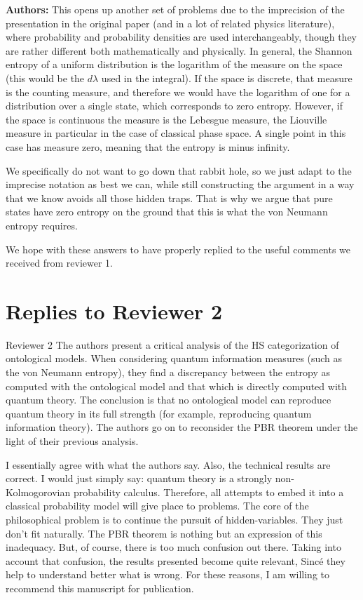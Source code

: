 \documentclass[11pt, executivepaper]{article}
\begin{document}
\begin{enumerate}
\textbf{Authors:} This opens up another set of problems due to the imprecision of the presentation in the original paper (and in a lot of related physics literature), where probability and probability densities are used interchangeably, though they are rather different both mathematically and physically. In general, the Shannon entropy of a uniform distribution is the logarithm of the measure on the space (this would be the $d\lambda$ used in the integral). If the space is discrete, that measure is the counting measure, and therefore we would have the logarithm of one for a distribution over a single state, which corresponds to zero entropy. However, if the space is continuous the measure is the Lebesgue measure, the Liouville measure in particular in the case of classical phase space. A single point in this case has measure zero, meaning that the entropy is minus infinity.

We specifically do not want to go down that rabbit hole, so we just adapt to the imprecise notation as best we can, while still constructing the argument in a way that we know avoids all those hidden traps. That is why we argue that pure states have zero entropy on the ground that this is what the von Neumann entropy requires.


\end{enumerate}
 

We hope with these answers to have properly replied to the useful comments we received from reviewer 1. 

\section{Replies to Reviewer 2}

Reviewer 2
The authors present a critical analysis of the HS categorization of ontological models. When considering quantum information measures (such as the von Neumann entropy), they find a discrepancy between the entropy as computed with the ontological model and that which is directly computed with quantum theory. The conclusion is that no ontological model can reproduce quantum theory in its full strength (for example, reproducing quantum information theory). The authors go on to reconsider the PBR theorem under the light of their previous analysis.

I essentially agree with what the authors say. Also, the technical results are correct. I would just simply say: quantum theory is a strongly non-Kolmogorovian probability calculus. Therefore, all attempts to embed it into a classical probability model will give place to problems. The core of the philosophical problem is to continue the pursuit of hidden-variables. They just don’t fit naturally. The PBR theorem is nothing but an expression of this inadequacy. But, of course, there is too much confusion out there. Taking into account that confusion, the results presented become quite relevant, Sincé they help to understand better what is wrong. For these reasons, I am willing to recommend this manuscript for publication.
\end{document}

